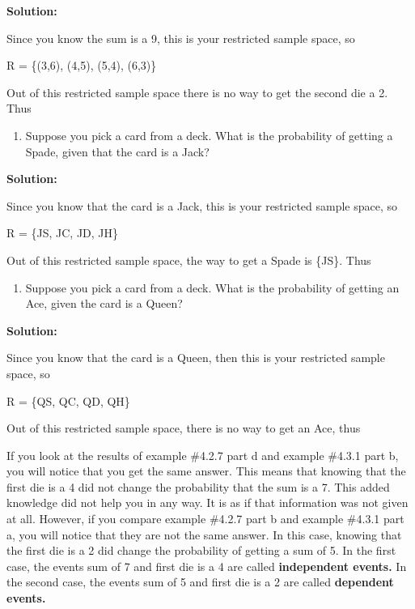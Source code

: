 \documentclass[]{book}
\providecommand{\tightlist}{%
  \setlength{\itemsep}{0pt}\setlength{\parskip}{0pt}}
\begin{document}
\textbf{Solution:}

Since you know the sum is a 9, this is your restricted sample space,
so

R = \{(3,6), (4,5), (5,4), (6,3)\}

Out of this restricted sample space there is no way to get the
second die a 2. Thus

\begin{enumerate}
\def\labelenumi{\alph{enumi}.}
\setcounter{enumi}{3}
\tightlist
\item
  Suppose you pick a card from a deck. What is the probability of
  getting a Spade, given that the card is a Jack?
\end{enumerate}

\textbf{Solution:}

Since you know that the card is a Jack, this is your restricted
sample space, so

R = \{JS, JC, JD, JH\}

Out of this restricted sample space, the way to get a Spade is \{JS\}.
Thus

\begin{enumerate}
\def\labelenumi{\alph{enumi}.}
\setcounter{enumi}{4}
\tightlist
\item
  Suppose you pick a card from a deck. What is the probability of
  getting an Ace, given the card is a Queen?
\end{enumerate}

\textbf{Solution:}

Since you know that the card is a Queen, then this is your
restricted sample space, so

R = \{QS, QC, QD, QH\}

Out of this restricted sample space, there is no way to get an Ace,
thus

If you look at the results of example \#4.2.7 part d and example \#4.3.1
part b, you will notice that you get the same answer. This means that
knowing that the first die is a 4 did not change the probability that
the sum is a 7. This added knowledge did not help you in any way. It is
as if that information was not given at all. However, if you compare
example \#4.2.7 part b and example \#4.3.1 part a, you will notice that
they are not the same answer. In this case, knowing that the first die
is a 2 did change the probability of getting a sum of 5. In the first
case, the events sum of 7 and first die is a 4 are called \textbf{independent
events.} In the second case, the events sum of 5 and first die is a 2
are called \textbf{dependent events.}
\end{document}

